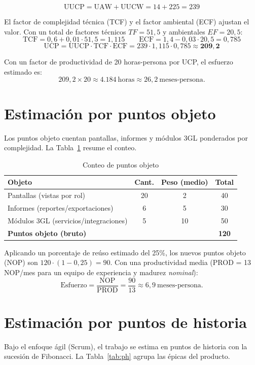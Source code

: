 \[
\text{UUCP} = \text{UAW} + \text{UUCW} = 14 + 225 = 239
\]

El factor de complejidad técnica (TCF) y el factor ambiental (ECF) ajustan el valor.
Con un total de factores técnicos $TF = 51{,}5$ y ambientales $EF = 20{,}5$:
\[
\text{TCF} = 0{,}6 + 0{,}01 \cdot 51{,}5 = 1{,}115 \qquad
\text{ECF} = 1{,}4 - 0{,}03 \cdot 20{,}5 = 0{,}785
\]
\[
\text{UCP} = \text{UUCP} \cdot \text{TCF} \cdot \text{ECF}
       = 239 \cdot 1{,}115 \cdot 0{,}785 \approx \mathbf{209{,}2}
\]

Con un factor de productividad de 20 horas-persona por UCP, el esfuerzo estimado es:
\[
209{,}2 \times 20 \approx 4.184\ \text{horas} \approx 26{,}2\ \text{meses-persona}.
\]

\section{Estimación por puntos objeto}
Los puntos objeto cuentan pantallas, informes y módulos 3GL ponderados por
complejidad. La Tabla~\ref{tab:po} resume el conteo.

\begin{table}[H]\centering
\caption{Conteo de puntos objeto}\label{tab:po}
\begin{tabularx}{\textwidth}{X c c c}
\toprule
\textbf{Objeto} & \textbf{Cant.} & \textbf{Peso (medio)} & \textbf{Total} \\
\midrule
Pantallas (vistas por rol) & 20 & 2 & 40 \\
Informes (reportes/exportaciones) & 6 & 5 & 30 \\
Módulos 3GL (servicios/integraciones) & 5 & 10 & 50 \\
\midrule
\textbf{Puntos objeto (bruto)} & & & \textbf{120} \\
\bottomrule
\end{tabularx}
\end{table}

Aplicando un porcentaje de reúso estimado del 25\%, los nuevos puntos objeto (NOP) son
$120 \cdot (1-0{,}25) = 90$. Con una productividad media (PROD = 13 NOP/mes para un
equipo de experiencia y madurez \emph{nominal}):
\[
\text{Esfuerzo} = \frac{\text{NOP}}{\text{PROD}} = \frac{90}{13} \approx 6{,}9\ \text{meses-persona}.
\]

\section{Estimación por puntos de historia}
Bajo el enfoque ágil (Scrum), el trabajo se estima en puntos de historia con la
sucesión de Fibonacci. La Tabla~\ref{tab:ph} agrupa las épicas del producto.

